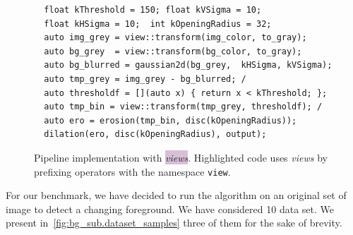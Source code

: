 \begin{figure}
  \begin{verbatim}
  float kThreshold = 150; float kVSigma = 10;
  float kHSigma = 10;  int kOpeningRadius = 32;
  auto img_grey = view::transform(img_color, to_gray);
  auto bg_grey  = view::transform(bg_color, to_gray);
  auto bg_blurred = gaussian2d(bg_grey,  kHSigma, kVSigma);
  auto tmp_grey = img_grey - bg_blurred; /
  auto thresholdf = [](auto x) { return x < kThreshold; };
  auto tmp_bin = view::transform(tmp_grey, thresholdf); /
  auto ero = erosion(tmp_bin, disc(kOpeningRadius));
  dilation(ero, disc(kOpeningRadius), output);
  \end{verbatim}
  \caption{Pipeline implementation with \colorbox{thistle}{\emph{views}}. Highlighted code uses \emph{views} by
    prefixing operators with the namespace \texttt{view}.}
  \label{fig.view.comp.sub_bg.view_code}
\end{figure}

For our benchmark, we have decided to run the algorithm on an original set of image to detect a changing foreground.
We have considered 10 data set. We present in~\cref{fig:bg_sub.dataset_samples} three of them for the sake of brevity.

